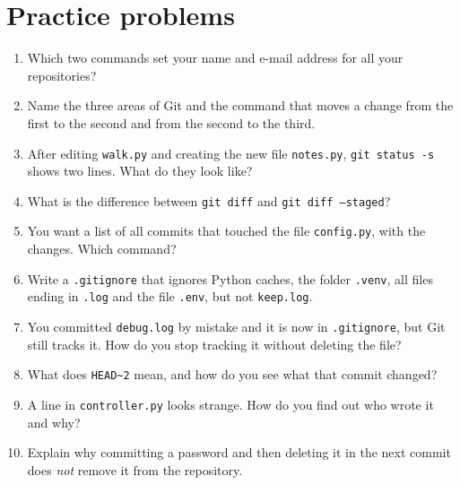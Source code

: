 \section*{Practice problems}
\begin{enumerate}[label=\textbf{\thechapter.\arabic*}]
  \item Which two commands set your name and e-mail address for all your repositories?
  \item Name the three areas of Git and the command that moves a change from the first to the second and from the second to the third.
  \item After editing \texttt{walk.py} and creating the new file \texttt{notes.py}, \texttt{git status -s} shows two lines. What do they look like?
  \item What is the difference between \texttt{git diff} and \texttt{git diff --staged}?
  \item You want a list of all commits that touched the file \texttt{config.py}, with the changes. Which command?
  \item Write a \texttt{.gitignore} that ignores Python caches, the folder \texttt{.venv}, all files ending in \texttt{.log} and the file \texttt{.env}, but not \texttt{keep.log}.
  \item You committed \texttt{debug.log} by mistake and it is now in \texttt{.gitignore}, but Git still tracks it. How do you stop tracking it without deleting the file?
  \item What does \texttt{HEAD\textasciitilde2} mean, and how do you see what that commit changed?
  \item A line in \texttt{controller.py} looks strange. How do you find out who wrote it and why?
  \item[\textbf{\thechapter.10}$\star$] Explain why committing a password and then deleting it in the next commit does \emph{not} remove it from the repository.
\end{enumerate}
